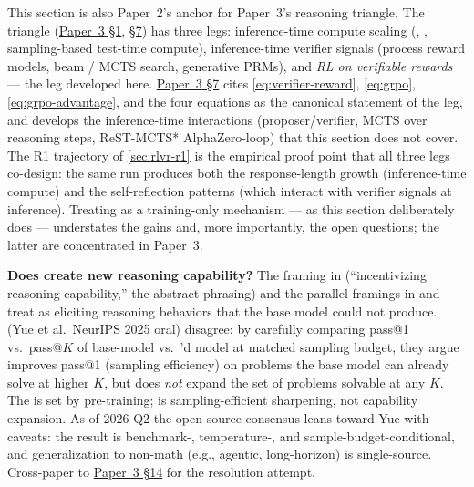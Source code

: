 This section is also Paper~2's anchor for Paper~3's reasoning triangle.
The triangle (\hyperref[P3-sec:introduction]{Paper~3 §1}, \hyperref[P3-sec:rlvr-grpo-dapo]{§7}) has three legs: inference-time compute
scaling (, , sampling-based test-time
compute), inference-time verifier signals (process reward models, beam
/ MCTS search, generative PRMs), and \emph{RL on verifiable rewards} —
the leg developed here. \hyperref[P3-sec:rlvr-grpo-dapo]{Paper~3 §7} cites
\cref{eq:verifier-reward}, \cref{eq:grpo}, \cref{eq:grpo-advantage}, and
the four  equations as the canonical statement of the  leg, and
develops the inference-time interactions (proposer/verifier, MCTS over
reasoning steps, ReST-MCTS* AlphaZero-loop) that this section does not
cover. The R1 trajectory of \cref{sec:rlvr-r1} is the empirical proof
point that all three legs co-design: the same  run produces both
the response-length growth (inference-time compute) and the
self-reflection patterns (which interact with verifier signals at
inference). Treating  as a training-only mechanism — as this
section deliberately does — understates the gains and, more
importantly, the open questions; the latter are concentrated in
Paper~3.

\begin{contradiction}
\textbf{Does  create new reasoning capability?} The framing in
\citet{deepseek-r1} (``incentivizing reasoning capability,'' the abstract
phrasing) and the parallel framings in \citet{tulu3} and \citet{qwen3}
treat  as eliciting reasoning behaviors that the base model could
not produce. \citet{rlvr-limits-2025} (Yue et al.\ NeurIPS 2025 oral)
disagree: by carefully comparing pass@1 vs.\ pass@$K$ of base-model
vs.\ 'd model at matched sampling budget, they argue  improves
pass@1 (sampling efficiency) on problems the base model can already
solve at higher $K$, but does \emph{not} expand the set of problems
solvable at any $K$. The  is set by pre-training;
 is sampling-efficient sharpening, not capability expansion. As of
2026-Q2 the open-source consensus leans toward Yue with caveats: the
result is benchmark-, temperature-, and sample-budget-conditional, and
generalization to non-math (e.g., agentic, long-horizon)  is
single-source. Cross-paper to \hyperref[P3-sec:contradictions]{Paper~3 §14} for the resolution attempt.
\end{contradiction}

